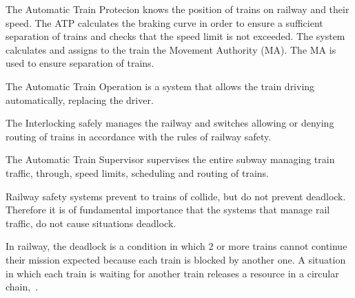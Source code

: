 \documentclass{ewic}
\begin{document}
The Automatic Train Protecion knows the position of trains on railway and their speed. The ATP calculates the braking curve in order to ensure a sufficient separation of trains and checks that the speed limit is not exceeded. The system calculates and assigns to the train the Movement Authority (MA). %
The MA is used to ensure separation of trains.
 
 
The Automatic Train Operation is a system that allows the train driving automatically, replacing the driver.
 

The Interlocking safely manages the railway and switches allowing or denying routing of trains in accordance with the rules of railway safety.

The Automatic Train Supervisor supervises the entire subway managing train traffic, through, speed limits, scheduling and routing of trains.

Railway safety systems prevent to trains of collide, but do not prevent deadlock. Therefore it is of fundamental importance that the systems that manage rail traffic, do not cause situations deadlock.

In railway, the deadlock is a condition in which 2 or more trains cannot  continue their mission expected because each train is blocked by another one.
A situation in which each train is waiting for another train releases a resource in a circular chain,~\cite{Pachl2012}.


\end{document}
